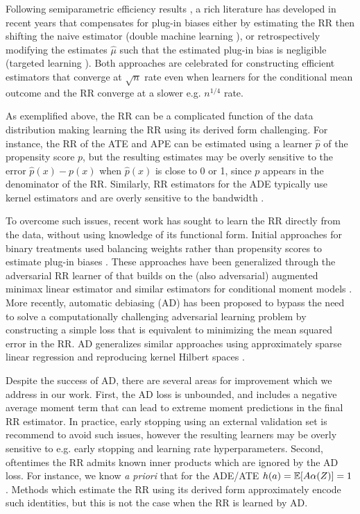 Following semiparametric efficiency results \citep{Robins1994,Newey1994}, a rich literature has developed in recent years that compensates for plug-in biases either by estimating the RR then shifting the naive estimator (double machine learning \citep{Chernozhukov2018}), or retrospectively modifying the estimates $\hat{\mu}$ such that the estimated plug-in bias is negligible (targeted learning \citep{van_der_laan_cross-validated_2011}). Both approaches are celebrated for constructing efficient estimators that converge at $\sqrt{n}$ rate even when learners for the conditional mean outcome and the RR converge at a slower e.g. $n^{1/4}$ rate. %

As exemplified above, the RR can be a complicated function of the data distribution making learning the RR using its derived form challenging. For instance, the RR of the ATE and APE can be estimated using a learner $\hat{p}$ of the propensity score $p$, but the resulting estimates may be overly sensitive to the error $\hat{p}(x) - p(x)$ when $\hat{p}(x)$ is close to 0 or 1, since $p$ appears in the denominator of the RR. Similarly, RR estimators for the ADE typically use kernel estimators and are overly sensitive to the bandwidth \citep{Cattaneo2013}.

To overcome such issues, recent work has sought to learn the RR directly from the data, without using knowledge of its functional form. Initial approaches for binary treatments used balancing weights rather than propensity scores to estimate plug-in biases \citep{Zubizarreta2015,Athey2018}. These approaches have been generalized through the adversarial RR learner of \citep{Chernozhukov2020} that builds on the (also adversarial) augmented minimax linear estimator \citep{Hirshberg2021} and similar estimators for conditional moment models \cite{Dikkala2020}. More recently, automatic debiasing (AD) \citep{Chernozhukov2021,Chernozhukov2022} has been proposed to bypass the need to solve a computationally challenging adversarial learning problem by constructing a simple loss that is equivalent to minimizing the mean squared error in the RR. AD generalizes similar approaches using approximately sparse linear regression \cite{Chernozhukov2022b} and reproducing kernel Hilbert spaces \cite{Singh2023}.

Despite the success of AD, there are several areas for improvement which we address in our work. First, the AD loss is unbounded, and includes a negative average moment term that can lead to extreme moment predictions in the final RR estimator. In practice, early stopping using an external validation set is recommend to avoid such issues, however the resulting learners may be overly sensitive to e.g. early stopping and learning rate hyperparameters. Second, oftentimes the RR admits known inner products which are ignored by the AD loss. For instance, we know \emph{a priori} that for the ADE/ATE $h(a) = \mathbb{E}[A\alpha(Z)] = 1$. Methods which estimate the RR using its derived form approximately encode such identities, but this is not the case when the RR is learned by AD.


